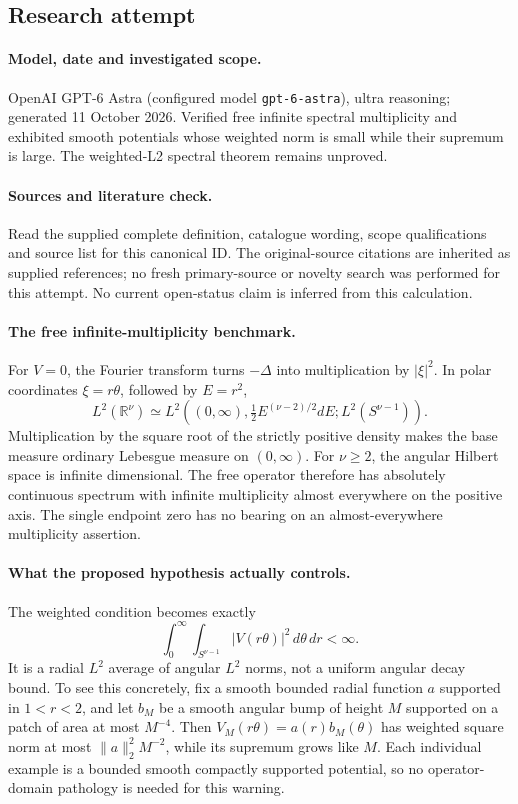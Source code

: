 \documentclass[11pt]{article}
\begin{document}
\subsection{Research attempt}
\paragraph{Model, date and investigated scope.}
OpenAI GPT-6 Astra (configured model \texttt{gpt-6-astra}), ultra reasoning; generated 11 October 2026. Verified free infinite spectral multiplicity and exhibited smooth potentials whose weighted norm is small while their supremum is large. The weighted-L2 spectral theorem remains unproved.

\paragraph{Sources and literature check.}
Read the supplied complete definition, catalogue wording, scope qualifications and source list for this canonical ID. The original-source citations are inherited as supplied references; no fresh primary-source or novelty search was performed for this attempt. No current open-status claim is inferred from this calculation.

\paragraph{The free infinite-multiplicity benchmark.}For \(V=0\), the Fourier transform turns \(-\Delta\) into multiplication by \(|\xi|^2\). In polar coordinates \(\xi=r\theta\), followed by \(E=r^2\),
\[L^2(\mathbb R^\nu)\simeq L^2\left((0,\infty),\tfrac12E^{(\nu-2)/2}dE;L^2(S^{\nu-1})\right).
\]
Multiplication by the square root of the strictly positive density makes the base measure ordinary Lebesgue measure on \((0,\infty)\). For \(\nu\ge2\), the angular Hilbert space is infinite dimensional. The free operator therefore has absolutely continuous spectrum with infinite multiplicity almost everywhere on the positive axis. The single endpoint zero has no bearing on an almost-everywhere multiplicity assertion.
\paragraph{What the proposed hypothesis actually controls.}The weighted condition becomes exactly
\[\int_0^\infty\int_{S^{\nu-1}}|V(r\theta)|^2\,d\theta\,dr<\infty.\]
It is a radial \(L^2\) average of angular \(L^2\) norms, not a uniform angular decay bound. To see this concretely, fix a smooth bounded radial function \(a\) supported in \(1<r<2\), and let \(b_M\) be a smooth angular bump of height \(M\) supported on a patch of area at most \(M^{-4}\). Then \(V_M(r\theta)=a(r)b_M(\theta)\) has weighted square norm at most \(\|a\|_2^2M^{-2}\), while its supremum grows like \(M\). Each individual example is a bounded smooth compactly supported potential, so no operator-domain pathology is needed for this warning.
\end{document}
